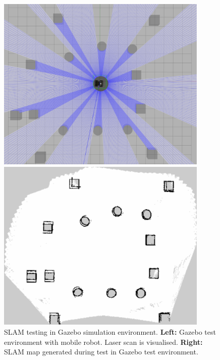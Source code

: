 \begin{figure}[H]
  \centering
  \begin{minipage}[b]{0.49\textwidth}
        \centering
        \includegraphics[width = 0.9\textwidth]{Figures/figMapGazeboSim2.pdf}
  \end{minipage}
  \hfill
  \begin{minipage}[b]{0.49\textwidth}
    \centering
    \includegraphics[width = 0.9\textwidth]{Figures/figMapSim.pdf}
  \end{minipage}
  \caption{SLAM testing in Gazebo simulation environment. \textbf{Left:} Gazebo test environment with mobile robot. Laser scan is visualised. \textbf{Right:} SLAM map generated during test in Gazebo test environment.}
  \label{fig:R:H:SLAM:figSLAMSim}
\end{figure}

